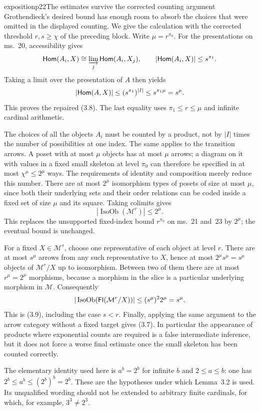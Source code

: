 \begin{dcomment}{exposition}{p22}{The estimates survive the corrected counting argument}
Grothendieck's desired bound has enough room to absorb the choices that were omitted in the displayed counting. We give the calculation with the corrected threshold $r,s\geq\chi$ of the preceding block. Write $\mu=r^{\pi_0}$. For the presentations on ms.~20, accessibility gives
\[
\mathsf{Hom}(A_i,X)\cong\varinjlim_j\mathsf{Hom}(A_i,X_j),
\qquad |\mathsf{Hom}(A_i,X)|\leq s^{\pi_1}.
\]
Taking a limit over the presentation of $A$ then yields
\[
|\mathsf{Hom}(A,X)|\leq (s^{\pi_1})^{|I|}
\leq s^{\pi_1\mu}=s^\mu.
\]
This proves the repaired (3.8). The last equality uses $\pi_1\leq r\leq\mu$ and infinite cardinal arithmetic.

The choices of all the objects $A_i$ must be counted by a product, not by $|I|$ times the number of possibilities at one index. The same applies to the transition arrows. A poset with at most $\mu$ objects has at most $\mu$ arrows; a diagram on it with values in a fixed small skeleton at level $\pi_0$ can therefore be specified in at most $\chi^\mu\leq 2^\mu$ ways. The requirements of identity and composition merely reduce this number. There are at most $2^\mu$ isomorphism types of posets of size at most $\mu$, since both their underlying sets and their order relations can be coded inside a fixed set of size $\mu$ and its square. Taking colimits gives
\[
|\operatorname{IsoOb}(\mathcal M^r)|\leq 2^\mu.
\]
This replaces the unsupported fixed-index bound $r^{\pi_0}$ on ms.~21 and~23 by $2^\mu$; the eventual bound is unchanged.

For a fixed $X\in\mathcal M^s$, choose one representative of each object at level $r$. There are at most $s^\mu$ arrows from any such representative to $X$, hence at most $2^\mu s^\mu=s^\mu$ objects of $\mathcal M^r/X$ up to isomorphism. Between two of them there are at most $r^\mu=2^\mu$ morphisms, because a morphism in the slice is a particular underlying morphism in $\mathcal M$. Consequently
\[
|\operatorname{IsoOb}(\mathsf{Fl}(\mathcal M^r/X))|
\leq(s^\mu)^2 2^\mu=s^\mu.
\]
This is (3.9), including the case $s<r$. Finally, applying the same argument to the arrow category without a fixed target gives (3.7). In particular the appearance of products where exponential counts are required is a false intermediate inference, but it does not force a worse final estimate once the small skeleton has been counted correctly.

The elementary identity used here is $a^b=2^b$ for infinite $b$ and $2\leq a\leq b$: one has $2^b\leq a^b\leq(2^b)^b=2^b$. These are the hypotheses under which Lemma~3.2 is used. Its unqualified wording should not be extended to arbitrary finite cardinals, for which, for example, $3^3\ne2^3$.
\end{dcomment}


